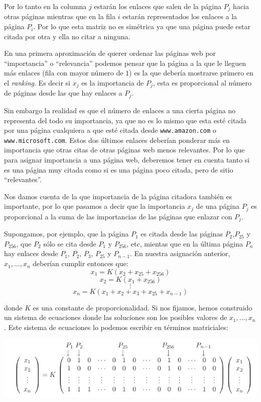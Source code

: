 \documentclass[size=a4, parskip=half, titlepage=false, toc=flat, toc=bib, 12pt]{scrartcl}
\theoremstyle{theorem-style}
\theoremstyle{definition-style}
\theoremstyle{remark-style}
\theoremstyle{example-style}
\theoremstyle{definition-style}
\theoremstyle{remark-style}
\begin{document}
Por lo tanto en la columna $j$ estarán los enlaces que salen de la página $P_j$ hacia otras páginas
mientras que en la fila $i$ estarán representados los enlaces a la página $P_i$. Por lo que esta matriz
no es simétrica ya que una página puede estar citada por otra y ella no citar a ninguna.

En una primera aproximación de querer ordenar las páginas web por ``importancia'' o ``relevancia'' podemos
pensar que la página a la que le lleguen más enlaces (fila con mayor número de $1$) es la que debería
mostrarse primero en el \textit{ranking}. Es decir si $x_j$ es la importancia de $P_j$, esta es proporcional
al número de páginas desde las que hay enlaces a $P_j$.

Sin embargo la realidad es que el número de enlaces a una cierta página no representa del todo su importancia,
ya que no es lo mismo que esta esté citada por una página cualquiera a que esté citada desde \verb|www.amazon.com| o
\verb|www.microsoft.com|. Estos dos últimos enlaces deberían ponderar más en importancia que otras citas de
otras páginas web menos relevantes. Por lo que para asignar importancia a una página web, deberemos tener
en cuenta tanto si es una página muy citada como si es una página poco citada, pero de sitio ``relevantes''.

Nos damos cuenta de la que importancia de la página citadora también es importante, por lo que pasamos a decir
que la importancia $x_j$ de una página $P_j$ es proporcional a la suma de las importancias de las páginas que enlazar
con $P_j$.

Supongamos, por ejemplo, que la página $P_1$ es citada desde las páginas $P_2$,$P_{25}$ y $P_{256}$,
 que $P_2$ sólo se cita desde $P_1$ y $P_{256}$, etc, mientas que en la última página $P_n$ hay enlaces
 desde $P_1$, $P_2$, $P_3$, $P_{25}$ y $P_{n-1}$. En nuestra asignación anterior, $x_1, \dots , x_n$ deberían
 cumplir entonces que:
 $$ x_1 = K (x_2 + x_{25} + x_{256}) $$
 $$ x_2 = K (x_1 + x_{256}) $$
 $$ \vdots $$
 $$x_n = K (x_1 + x_2 + x_3 + x_25 + x_{n-1}) $$

donde $K$ es una constante de proporcionalidad. Si nos fijamos, hemos construido un sistema de ecuaciones
donde las soluciones son los posibles valores de $x_1, \dots , x_n$. Este sistema de ecuaciones
lo podemos escribir en términos matriciales:

\includegraphics[width=1.0\textwidth]{./img/sde}
\end{document}
